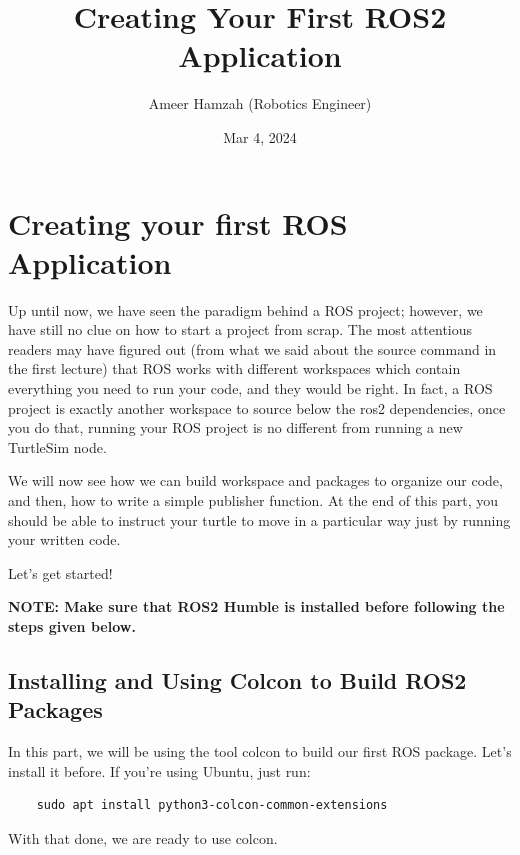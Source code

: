 \documentclass{article}
\begin{document}
\title{\textbf{Creating Your First ROS2 Application}}
\author{Ameer Hamzah (Robotics Engineer)}
\date{Mar 4, 2024}
\maketitle

\section{Creating your first ROS Application}
Up until now, we have seen the paradigm behind a ROS project; however, we have still no clue on how to start a project from scrap.
The most attentious readers may have figured out (from what we said about the source command in the first lecture) that ROS works with different workspaces which contain everything you need to run your code, and they would be right.
In fact, a ROS project is exactly another workspace to source below the ros2 dependencies, once you do that, running your ROS project is no different from running a new TurtleSim node.

We will now see how we can build workspace and packages to organize our code, and then, how to write a simple publisher function.
At the end of this part, you should be able to instruct your turtle to move in a particular way just by running your written code.

\vspace{10pt} 
Let's get started!

\vspace{12pt} 
\textbf{NOTE: Make sure that ROS2 Humble is installed before following the steps given below.}
\subsection{Installing and Using Colcon to Build ROS2 Packages}
In this part, we will be using the tool colcon to build our first ROS package.
Let's install it before.
If you're using Ubuntu, just run: 
\begin{verbatim}
    sudo apt install python3-colcon-common-extensions 
\end{verbatim}
With that done, we are ready to use colcon.
\end{document}
